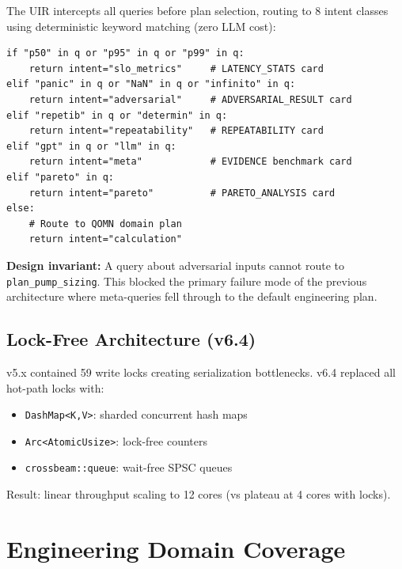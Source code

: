 \documentclass[11pt]{article}
\begin{document}
The UIR intercepts all queries before plan selection, routing to 8 intent classes
using deterministic keyword matching (zero LLM cost):

\begin{lstlisting}[caption={UIR decision tree (Python, simplified)}]
if "p50" in q or "p95" in q or "p99" in q:
    return intent="slo_metrics"     # LATENCY_STATS card
elif "panic" in q or "NaN" in q or "infinito" in q:
    return intent="adversarial"     # ADVERSARIAL_RESULT card
elif "repetib" in q or "determin" in q:
    return intent="repeatability"   # REPEATABILITY card
elif "gpt" in q or "llm" in q:
    return intent="meta"            # EVIDENCE benchmark card
elif "pareto" in q:
    return intent="pareto"          # PARETO_ANALYSIS card
else:
    # Route to QOMN domain plan
    return intent="calculation"
\end{lstlisting}

\textbf{Design invariant:} A query about adversarial inputs cannot route to
\texttt{plan\_pump\_sizing}. This blocked the primary failure mode of the previous
architecture where meta-queries fell through to the default engineering plan.

\subsection{Lock-Free Architecture (v6.4)}

v5.x contained 59 write locks creating serialization bottlenecks.
v6.4 replaced all hot-path locks with:
\begin{itemize}
\item \texttt{DashMap<K,V>}: sharded concurrent hash maps
\item \texttt{Arc<AtomicUsize>}: lock-free counters
\item \texttt{crossbeam::queue}: wait-free SPSC queues
\end{itemize}
Result: linear throughput scaling to 12 cores (vs plateau at 4 cores with locks).

\section{Engineering Domain Coverage}
\end{document}
